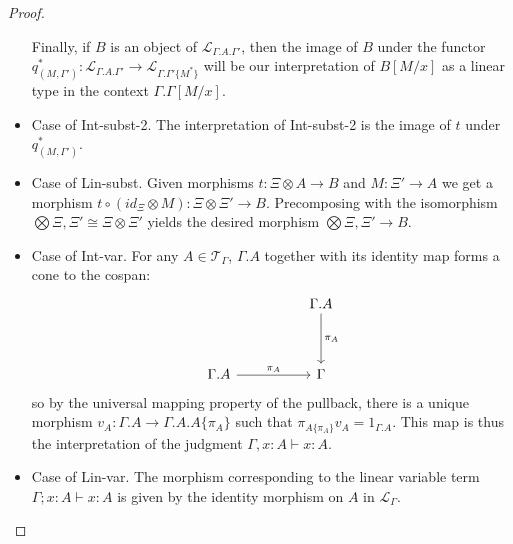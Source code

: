 \begin{thm}
\begin{proof}
\begin{itemize}
Finally, if $B$ is an object of $\mathcal{L}_{\Gamma.A.\Gamma'}$, then the image of $B$ under the functor $q_{(M, \Gamma')}^* : \mathcal{L}_{\Gamma.A.\Gamma'} \to \mathcal{L}_{\Gamma.\Gamma'\{M^*\}}$ will be our interpretation of $B[M/x]$ as a linear type in the context $\Gamma.\Gamma[M/x]$.
\item Case of Int-subst-2. The interpretation of Int-subst-2 is the image of $t$ under $q_{(M, \Gamma')}^*$.
\item Case of Lin-subst. Given morphisms $t : \Xi \otimes A \to B$ and $M : \Xi' \to A$ we get a morphism $t \circ (id_\Xi \otimes M) : \Xi \otimes \Xi' \to B$. Precomposing with the isomorphism $\bigotimes \Xi, \Xi' \cong \Xi \otimes \Xi'$ yields the desired morphism $\bigotimes \Xi, \Xi' \to B$.
\item Case of Int-var. For any $A \in \mathcal{T}_\Gamma$, $\Gamma.A$ together with its identity map forms a cone to the cospan:
  \[
    \ti
& \Gamma.A \ar[d, "\pi_A"]\\
    \Gamma.A \ar[r, "\pi_A"] & \Gamma
    \kz
  \]
  so by the universal mapping property of the pullback, there is a unique morphism $v_A : \Gamma.A \to \Gamma.A.A\{\pi_A\}$ such that $\pi_{A\{\pi_A\}}v_A = 1_{\Gamma.A}$.
  This map is thus the interpretation of the judgment $\Gamma, x : A \vdash x : A$.
\item Case of Lin-var. The morphism corresponding to the linear variable term $\Gamma; x : A \vdash x : A$ is given by the identity morphism on $A$ in $\mathcal{L}_{\Gamma}$.
\end{itemize}
\end{proof}
\end{thm}
